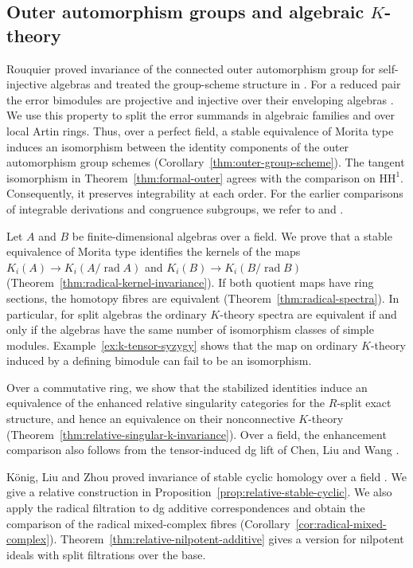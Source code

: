 \documentclass[12pt,a4paper,english,reqno]{amsart}
\numberwithin{equation}{section}
\theoremstyle{plain}
\theoremstyle{definition}
\begin{document}
\subsection{Outer automorphism groups and algebraic $K$-theory}

Rouquier proved invariance of the connected outer automorphism
group for self-injective algebras
\cite[Theorem~4.15]{Rouquier2011Automorphisms} and treated the
group-scheme structure in \cite[Theorem~4.3]{RouquierGroupesPreprint}.
For a reduced pair the error bimodules are projective and injective
over their enveloping algebras \cite[Lemma~4.1(3)]{CPX2012}. We use
this property to split the error summands in algebraic families
and over local Artin rings. Thus, over a perfect field, a stable
equivalence of Morita type induces an isomorphism between the
identity components of the outer automorphism group schemes
(Corollary~\ref{thm:outer-group-scheme}). The tangent isomorphism in
Theorem~\ref{thm:formal-outer} agrees with the comparison on
$\mathrm{HH}^1$. Consequently, it preserves integrability at
each order. For the earlier comparisons of integrable derivations
and congruence subgroups, we refer to
\cite[Theorem~5.1 and Lemma~5.2]{LinckelmannIntegrable} and
\cite[Theorem~2]{BriggsRubioIntegrable}.

Let $A$ and $B$ be finite-dimensional algebras over a field.
We prove that a stable equivalence of Morita type identifies the
kernels of the maps $K_i(A)\to K_i(A/\operatorname{rad}A)$ and
$K_i(B)\to K_i(B/\operatorname{rad}B)$
(Theorem~\ref{thm:radical-kernel-invariance}). If both quotient maps
have ring sections, the homotopy fibres are equivalent
(Theorem~\ref{thm:radical-spectra}). In particular, for split
algebras the ordinary $K$-theory spectra are equivalent if and only
if the algebras have the same number of isomorphism classes of
simple modules. Example~\ref{ex:k-tensor-syzygy} shows that the map
on ordinary $K$-theory induced by a defining bimodule can fail to
be an isomorphism.

Over a commutative ring, we show that the stabilized identities
induce an equivalence of the enhanced relative singularity
categories for the $R$-split exact structure, and hence an
equivalence on their nonconnective $K$-theory
(Theorem~\ref{thm:relative-singular-k-invariance}). Over a field,
the enhancement comparison also follows from the tensor-induced
dg lift of Chen, Liu and Wang
\cite[Proposition~3.1 and Lemma~3.2]{ChenLiuWang2023}.

K\"onig, Liu and Zhou proved invariance of stable cyclic
homology over a field \cite[Theorem~9.9]{KoenigLiuZhou2012}.
We give a relative construction in
Proposition~\ref{prop:relative-stable-cyclic}. We also apply the
radical filtration to dg additive correspondences and obtain
the comparison of the radical mixed-complex fibres
(Corollary~\ref{cor:radical-mixed-complex}).
Theorem~\ref{thm:relative-nilpotent-additive} gives a version for
nilpotent ideals with split filtrations over the base.
\end{document}
